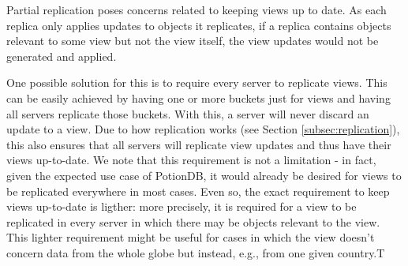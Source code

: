 \documentclass{vldb}
\newcommand{\grumbler}[2]{{\color{red}{\bf #1:} #2}}
\renewcommand{\grumbler}[2]{}
\newcommand{\andre}[1]{\grumbler{andre}{#1}}
\begin{document}



Partial replication poses concerns related to keeping views up to date.
As each replica only applies updates to objects it replicates, if a replica contains objects relevant to some view but not the view itself, the view updates would not be generated and applied.


One possible solution for this is to require every server to replicate views.
This can be easily achieved by having one or more buckets just for views and having all servers replicate those buckets.
With this, a server will never discard an update to a view.
Due to how replication works (see Section \ref{subsec:replication}), this also ensures that all servers will replicate view updates and thus have their views up-to-date.
We note that this requirement is not a limitation - in fact, given the expected use case of PotionDB, it would already be desired for views to be replicated everywhere in most cases.
Even so, the exact requirement to keep views up-to-date is ligther:
more precisely, it is required for a view to be replicated in every server in which there may be objects relevant to the view.
This lighter requirement might be useful for cases in which the view doesn't concern data from the whole globe but instead, e.g., from one given country.T
\end{document}
